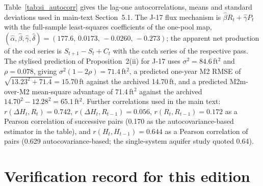 Table~\ref{tab:si_autocorr} gives the lag-one autocorrelations, means and standard deviations used in main-text Section~5.1. The J-17 flux mechanism is $\hat\beta R_t+\hat\gamma P_t$ with the full-sample least-squares coefficients of the one-pool map, $(\hat\alpha,\hat\beta,\hat\gamma,\hat\delta)=(177.6,\,0.0173,\,-0.0260,\,-0.273)$; the apparent net production of the cod series is $S_{t+1}-S_t+C_t$ with the catch series of the respective pass. The stylised prediction of Proposition~2(ii) for J-17 uses $\sigma^2=84.6$\,ft$^2$ and $\rho=0.078$, giving $\sigma^2(1-2\rho)=71.4$\,ft$^2$, a predicted one-year M2 RMSE of $\sqrt{13.23^2+71.4}=15.70$\,ft against the archived 14.70\,ft, and a predicted M2m-over-M2 mean-square advantage of 71.4\,ft$^2$ against the archived $14.70^2-12.28^2=65.1$\,ft$^2$. Further correlations used in the main text: $r(\Delta H_t,R_t)=0.742$, $r(\Delta H_t,R_{t-1})=0.056$, $r(R_t,R_{t-1})=0.172$ as a Pearson correlation of successive pairs (0.170 as the autocovariance-based estimator in the table), and $r(H_t,H_{t-1})=0.644$ as a Pearson correlation of pairs (0.629 autocovariance-based; the single-system aquifer study quoted 0.64).

\begin{table}[!htb]
\centering\small
\caption{Lag-one autocorrelations (autocovariance estimator), means and standard deviations of the series used in main-text Section~5.1. Units: ft and $10^3$ acre-ft for J-17; kt for cod.}
\label{tab:si_autocorr}

\end{table}

\section{Verification record for this edition}\label{si:verify}

